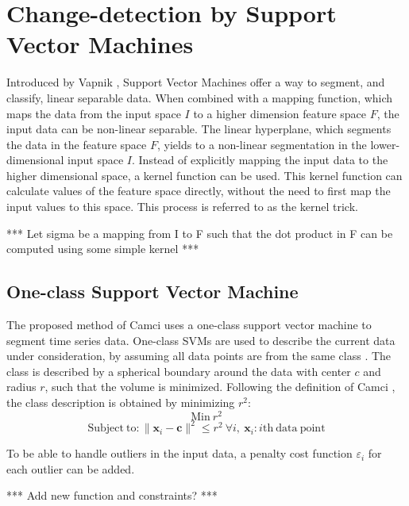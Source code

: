 \section{Change-detection by Support Vector Machines}

Introduced by Vapnik \cite{vapnik1998statistical, vapnik1999nature}, Support Vector Machines offer a way to segment, and classify, linear separable data.
When combined with a mapping function, which maps the data from the input space $I$ to a higher dimension feature space $F$, the input data can be non-linear separable.
The linear hyperplane, which segments the data in the feature space $F$, yields to a non-linear segmentation in the lower-dimensional input space $I$.
Instead of explicitly mapping the input data to the higher dimensional space, a kernel function can be used.
This kernel function can calculate values of the feature space directly, without the need to first map the input values to this space.
This process is referred to as the kernel trick.

*** Let sigma be a mapping from I to F such that the dot product in F can be computed using some simple kernel ***

\subsection{One-class Support Vector Machine}
The proposed method of Camci \cite{camci2010change} uses a one-class support vector machine to segment time series data.
One-class SVMs are used to describe the current data under consideration, by assuming all data points are from the same class \cite{tax2001one}.
The class is described by a spherical boundary around the data with center $c$ and radius $r$, such that the volume is minimized.
Following the definition of Camci \cite{camci2010change}, the class description is obtained by minimizing $r^2$:
\begin{equation}
  \mathrm{Min}\ r^2
\end{equation}
\begin{equation}
  \mathrm{Subject\ to} : \|\mathbf{x}_i - \mathbf{c}\|^2 \le r^2\ \forall i,\ \mathbf{x}_i : i \mathrm{th\ data\ point}
\end{equation}

To be able to handle outliers in the input data, a penalty cost function $\varepsilon_i$ for each outlier can be added.

*** Add new function and constraints? ***

